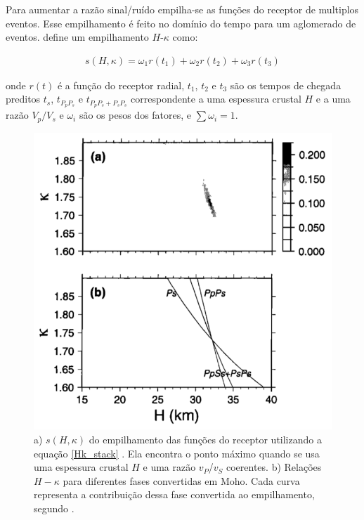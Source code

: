 Para aumentar a razão sinal/ruído empilha-se as funções do receptor de multiplos eventos. Esse empilhamento é feito no domínio do tempo para um aglomerado de eventos. \cite{Zhu_Kanamori_2000} define um empilhamento $H$-$\kappa$ como:

\begin{eqnarray} \label{Hk_stack}
s(H,\kappa) = \omega_{1}r(t_{1}) + \omega_{2}r(t_{2}) + \omega_{3}r(t_{3})
\end{eqnarray}

onde $r(t)$ é a função do receptor radial, $t_{1}$, $t_{2}$ e $t_{3}$ são os tempos de chegada preditos  $t_{s}$,  $t_{P_{p}P_{s}}$ e  $t_{P_{p}P_{s}+P_{s}P_{s}}$ correspondente a uma espessura crustal $H$ e a uma razão $V_{p}/V_{s}$ e $\omega_{i}$ são os pesos dos fatores, e $\sum \omega_{i} = 1$. 

\begin{figure}[!ht]
\centering
\includegraphics[scale=0.5]{Figs/grid_search.png}
\caption[a) $s(H,\kappa)$ do empilhamento das funções do receptor utilizando a equação \ref{Hk_stack}.b) Relações $H-\kappa$ para diferentes fases convertidas em Moho.]{a) $s(H,\kappa)$ do empilhamento das funções do receptor utilizando a equação \ref{Hk_stack} . Ela encontra o ponto máximo quando se usa uma espessura crustal $H$ e uma razão $v_{P}$/$v_{S}$ coerentes. b) Relações $H-\kappa$ para diferentes fases convertidas em Moho. Cada curva representa a contribuição dessa fase convertida ao empilhamento, segundo \cite{Zhu_Kanamori_2000}.}
\label{grid_search}
\end{figure}

